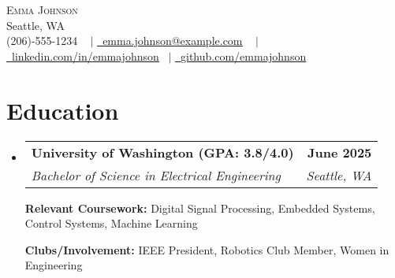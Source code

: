 \documentclass[letterpaper,11pt]{article}
\makeatletter
\newcommand{\resumeSubheading}[4]{
  \vspace{-2pt}\item
    \begin{tabular*}{1.0\textwidth}[t]{l@{\extracolsep{\fill}}r}
      \textbf{#1} & \textbf{\small #2} \\
      \textit{\small#3} & \textit{\small #4} \\
    \end{tabular*}\vspace{-7pt}
}
\newcommand{\resumeSubHeadingListStart}{\begin{itemize}[leftmargin=0.0in, label={}]}
\newcommand{\resumeSubHeadingListEnd}{\end{itemize}}
\makeatother
\begin{document}


\begin{center}
    {\Huge \scshape  Emma Johnson  } \\ \vspace{1pt}
                \vspace{-1pt}
    Seattle, WA \\ \vspace{0pt}
            \vspace{0pt}
    \small \raisebox{-0.1\height} (206)-555-1234 ~ $\vert$ \href{mailto:emma.johnson@example.com}{\raisebox{-0.2\height}\ \underline{emma.johnson@example.com}} ~ $\vert$
        \vspace{4pt}
    \href{https://linkedin.com/in/emmajohnson}{\raisebox{-0.2\height}\ \underline{linkedin.com/in/emmajohnson}}  ~$\vert$
    \href{https://github.com/emmajohnson}{\raisebox{-0.2\height}\ \underline{github.com/emmajohnson}}

    \vspace{-14pt}
\end{center}


\section{Education}
  \resumeSubHeadingListStart
    \resumeSubheading
      {University of Washington (GPA: 3.8/4.0)}{June 2025}
      {Bachelor of Science in Electrical Engineering}{Seattle, WA}
          \vspace{-2pt}

    {\textbf{Relevant Coursework:}  Digital Signal Processing, Embedded Systems, Control Systems, Machine Learning}
          \vspace{-2pt}

    {\textbf{Clubs/Involvement:} IEEE President, Robotics Club Member, Women in Engineering}

  \resumeSubHeadingListEnd

\end{document}
